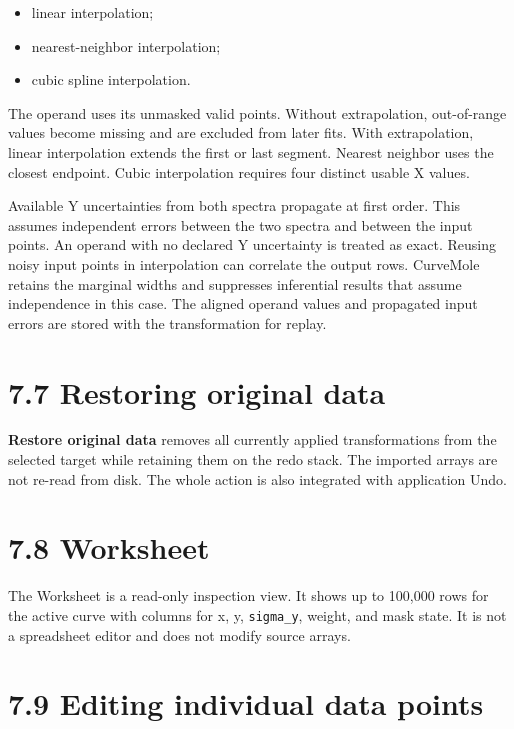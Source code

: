 \documentclass[
  10pt,
  a4paper,
  oneside]{scrreprt}
\providecommand{\tightlist}{%
  \setlength{\itemsep}{0pt}\setlength{\parskip}{0pt}}
\begin{document}
\begin{itemize}
\tightlist
\item
  linear interpolation;
\item
  nearest-neighbor interpolation;
\item
  cubic spline interpolation.
\end{itemize}

The operand uses its unmasked valid points. Without extrapolation,
out-of-range values become missing and are excluded from later fits.
With extrapolation, linear interpolation extends the first or last
segment. Nearest neighbor uses the closest endpoint. Cubic interpolation
requires four distinct usable X values.

Available Y uncertainties from both spectra propagate at first order.
This assumes independent errors between the two spectra and between the
input points. An operand with no declared Y uncertainty is treated as
exact. Reusing noisy input points in interpolation can correlate the
output rows. CurveMole retains the marginal widths and suppresses
inferential results that assume independence in this case. The aligned
operand values and propagated input errors are stored with the
transformation for replay.

\hypertarget{restoring-original-data}{%
\section{7.7 Restoring original data}\label{restoring-original-data}}

\textbf{Restore original data} removes all currently applied
transformations from the selected target while retaining them on the
redo stack. The imported arrays are not re-read from disk. The whole
action is also integrated with application Undo.

\hypertarget{worksheet}{%
\section{7.8 Worksheet}\label{worksheet}}

The Worksheet is a read-only inspection view. It shows up to 100,000
rows for the active curve with columns for x, y, \texttt{sigma\_y},
weight, and mask state. It is not a spreadsheet editor and does not
modify source arrays.

\hypertarget{editing-individual-data-points}{%
\section{7.9 Editing individual data
points}\label{editing-individual-data-points}}
\end{document}
